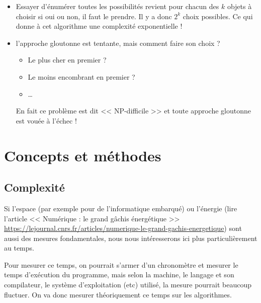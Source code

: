 \begin{itemize}
	\item Essayer d'énumérer toutes les possibilités revient pour chacun des $k$ objets à choisir si oui ou non, il faut le prendre. Il y a donc $2^k$ choix possibles. Ce qui donne à cet algorithme une complexité exponentielle !
	\item l'approche gloutonne est tentante, mais comment faire son choix ?
	
	\begin{itemize}
		\item Le plus cher en premier ?
		\item Le moins encombrant en premier ?
		\item \ldots
	\end{itemize}
	
	En fait ce problème est dit << NP-difficile >> et toute approche gloutonne est vouée à l'échec ! 
\end{itemize}



\chapter{Concepts et méthodes}

\section{Complexité}


Si l'espace (par exemple pour de l'informatique embarqué) ou l'énergie (lire l'article << Numérique : le grand gâchis énergétique >> \href{https://lejournal.cnrs.fr/articles/numerique-le-grand-gachis-energetique}{https://lejournal.cnrs.fr/articles/numerique-le-grand-gachis-energetique}) sont aussi des mesures fondamentales, nous nous intéresserons ici plus particulièrement au temps.

\medskip

Pour mesurer ce temps, on pourrait s'armer d'un chronomètre et mesurer le temps d'exécution du programme, mais selon la machine, le langage et son compilateur, le système d'exploitation (etc) utilisé, la mesure pourrait beaucoup fluctuer. On va donc mesurer théoriquement ce temps sur les algorithmes.

